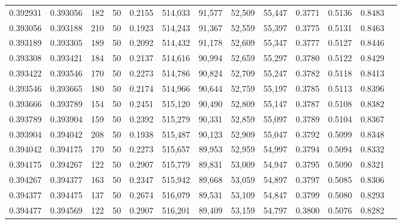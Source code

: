 \begin{tabular}{rrrrrrrrrrrrr}
0.392931 & 0.393056 &   182 &  50 &                                     0.2155 & 514,033 &  91,577 &  52,509 &  55,447 & 0.3771 & 0.5136 & 0.8483 \\
0.393056 & 0.393188 &   210 &  50 &                                     0.1923 & 514,243 &  91,367 &  52,559 &  55,397 & 0.3775 & 0.5131 & 0.8463 \\
0.393189 & 0.393305 &   189 &  50 &                                     0.2092 & 514,432 &  91,178 &  52,609 &  55,347 & 0.3777 & 0.5127 & 0.8446 \\
0.393308 & 0.393421 &   184 &  50 &                                     0.2137 & 514,616 &  90,994 &  52,659 &  55,297 & 0.3780 & 0.5122 & 0.8429 \\
0.393422 & 0.393546 &   170 &  50 &                                     0.2273 & 514,786 &  90,824 &  52,709 &  55,247 & 0.3782 & 0.5118 & 0.8413 \\
0.393546 & 0.393665 &   180 &  50 &                                     0.2174 & 514,966 &  90,644 &  52,759 &  55,197 & 0.3785 & 0.5113 & 0.8396 \\
0.393666 & 0.393789 &   154 &  50 &                                     0.2451 & 515,120 &  90,490 &  52,809 &  55,147 & 0.3787 & 0.5108 & 0.8382 \\
0.393789 & 0.393904 &   159 &  50 &                                     0.2392 & 515,279 &  90,331 &  52,859 &  55,097 & 0.3789 & 0.5104 & 0.8367 \\
0.393904 & 0.394042 &   208 &  50 &                                     0.1938 & 515,487 &  90,123 &  52,909 &  55,047 & 0.3792 & 0.5099 & 0.8348 \\
0.394042 & 0.394175 &   170 &  50 &                                     0.2273 & 515,657 &  89,953 &  52,959 &  54,997 & 0.3794 & 0.5094 & 0.8332 \\
0.394175 & 0.394267 &   122 &  50 &                                     0.2907 & 515,779 &  89,831 &  53,009 &  54,947 & 0.3795 & 0.5090 & 0.8321 \\
0.394267 & 0.394377 &   163 &  50 &                                     0.2347 & 515,942 &  89,668 &  53,059 &  54,897 & 0.3797 & 0.5085 & 0.8306 \\
0.394377 & 0.394475 &   137 &  50 &                                     0.2674 & 516,079 &  89,531 &  53,109 &  54,847 & 0.3799 & 0.5080 & 0.8293 \\
0.394477 & 0.394569 &   122 &  50 &                                     0.2907 & 516,201 &  89,409 &  53,159 &  54,797 & 0.3800 & 0.5076 & 0.8282 \\

\end{tabular}
